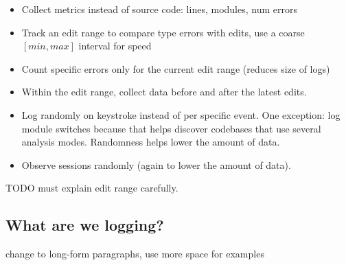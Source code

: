 \documentclass[english,submission,cleveref]{programming}
\begin{document}
\begin{itemize}
  \item
    Collect metrics instead of source code: lines, modules, num errors
  \item
    Track an edit range to compare type errors with edits,
    use a coarse $[min, max]$ interval for speed
  \item
    Count specific errors only for the current edit range
    (reduces size of logs)
  \item
    Within the edit range, collect data before and after the latest edits.
  \item
    Log randomly on keystroke instead of per specific event.
    One exception: log module switches because that helps discover
    codebases that use several analysis modes.
    Randomness helps lower the amount of data.
  \item
    Observe sessions randomly (again to lower the amount of data).
\end{itemize}

TODO must explain edit range carefully.


\subsection{What are we logging?}

\FILL{} change to long-form paragraphs, use more space for examples
\end{document}
